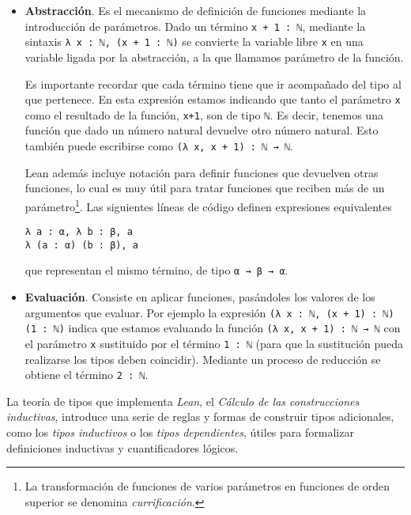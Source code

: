\begin{itemize}[topsep=0pt]

	\item \textbf{Abstracción}. Es el mecanismo de definición de funciones mediante
	      la introducción de parámetros. Dado un término \lstinline{x + 1 : ℕ},
	      mediante la sintaxis \lstinline{λ x : ℕ, (x + 1 : ℕ)} se convierte la
	      variable libre \lstinline{x} en una variable ligada por la abstracción, a la
	      que llamamos parámetro de la función.

	      Es importante recordar que cada término tiene que ir acompañado del tipo al
	      que pertenece. En esta expresión estamos indicando que tanto el parámetro
	      \lstinline{x} como el resultado de la función, \lstinline{x+1}, son de tipo
	      \lstinline{ℕ}. Es decir, tenemos una función que dado un número natural
	      devuelve otro número natural. Esto también puede escribirse como
	      \lstinline{(λ x, x + 1) : ℕ → ℕ}.

	      Lean además incluye notación para definir funciones que devuelven otras
	      funciones, lo cual es muy útil para tratar funciones que reciben más de un
	      parámetro\footnote{La transformación de funciones de varios
		      parámetros en funciones de orden superior se denomina
		      \textit{currificación}.}. Las siguientes líneas de código
	      definen expresiones equivalentes
	      \begin{lstlisting}
λ a : α, λ b : β, a
λ (a : α) (b : β), a
\end{lstlisting}
	      que representan el mismo término, de tipo \lstinline{α → β → α}.

	\item \textbf{Evaluación}. Consiste en aplicar funciones, pasándoles los
	      valores de los argumentos que evaluar. Por ejemplo la expresión
	      \lstinline{(λ x : ℕ, (x + 1) : ℕ) (1 : ℕ)} indica que estamos evaluando la
	      función \lstinline{(λ x, x + 1) : ℕ → ℕ} con el parámetro \lstinline{x}
	      sustituido por el término \lstinline{1 : ℕ} (para que la sustitución pueda
	      realizarse los tipos deben coincidir). Mediante un proceso de
	      reducción se obtiene el término \lstinline{2 : ℕ}.

\end{itemize}

La teoría de tipos que implementa \textit{Lean}, el \textit{Cálculo de las
	construcciones inductivas}, introduce una serie de reglas y formas de construir
tipos adicionales, como los \textit{tipos inductivos} o los \textit{tipos
	dependientes}, útiles para formalizar definiciones inductivas y cuantificadores
lógicos.

